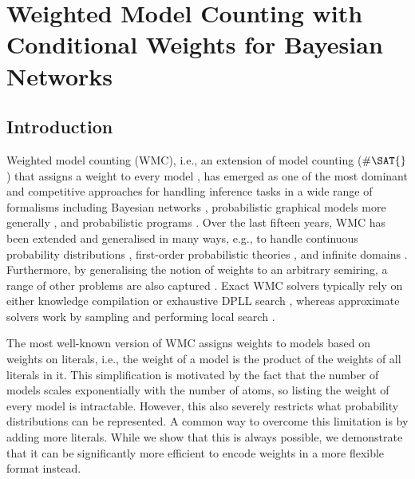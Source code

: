 \chapter{Weighted Model Counting with Conditional Weights for Bayesian Networks}

\section{Introduction}

Weighted model counting (WMC), i.e., an extension of model counting ($\#\SAT{}$)
that assigns a weight to every model \citep{DBLP:conf/aaai/SangBK05}, has
emerged as one of the most dominant and competitive approaches for handling
inference tasks in a wide range of formalisms including Bayesian networks
\citep{DBLP:conf/aaai/SangBK05,DBLP:books/daglib/0024906}, probabilistic
graphical models more generally \citep{DBLP:conf/ecsqaru/ChoiKD13}, and
probabilistic programs
\citep{DBLP:journals/tplp/FierensBRSGTJR15,DBLP:journals/corr/abs-2005-09089}.
Over the last fifteen years, WMC has been extended and generalised in many ways,
e.g., to handle continuous probability distributions
\citep{DBLP:conf/ijcai/BellePB15}, first-order probabilistic theories
\citep{DBLP:conf/ijcai/BroeckTMDR11,DBLP:journals/cacm/GogateD16}, and infinite
domains \citep{DBLP:conf/aaai/Belle17}. Furthermore, by generalising the notion
of weights to an arbitrary semiring, a range of other problems are also captured
\citep{DBLP:journals/japll/KimmigBR17}. Exact WMC solvers typically rely on
either knowledge compilation
\citep{DBLP:conf/ijcai/OztokD15,DBLP:conf/ijcai/LagniezM17} or exhaustive DPLL
search \citep{DBLP:conf/aaai/SangBK05}, whereas approximate solvers work by
sampling \citep{DBLP:conf/aaai/ChakrabortyFMSV14} and performing local search
\citep{DBLP:conf/sat/WeiS05}.

The most well-known version of WMC assigns weights to models based on
weights on literals, i.e., the weight of a model is the product of the weights
of all literals in it. This simplification is motivated by the fact that the
number of models scales exponentially with the number of atoms, so listing the
weight of every model is intractable. However, this also severely restricts what
probability distributions can be represented. A common way to overcome this
limitation is by adding more literals. While we show that this is always
possible, we demonstrate that it can be significantly more efficient to
encode weights in a more flexible format instead.

